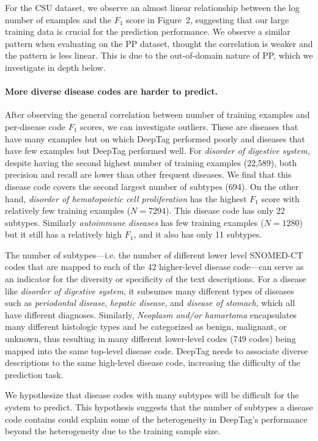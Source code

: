 \documentclass{article}[11pt,oneside]
\begin{document}
For the CSU dataset, we observe an almost linear relationship between the log number of examples and the $F_1$ score in Figure~2, suggesting that our large training data is crucial for the prediction performance. 
We observe a similar pattern when evaluating on the PP dataset, thought the correlation is weaker and the pattern is less linear. This is due to the out-of-domain nature of PP, which we investigate in depth below.

\paragraph{More diverse disease codes are harder to predict.}
After observing the general correlation between number of training examples and per-disease code $F_1$ scores, we can investigate outliers. These are diseases that have many examples but on which DeepTag performed poorly and diseases that have few examples but DeepTag performed well. For \emph{disorder of digestive system}, despite having the second highest number of training examples (22,589), both precision and recall are lower than other frequent diseases. We find that this disease code covers the second largest number of subtypes (694). On the other hand, \emph{disorder of hematopoietic cell proliferation} has the highest $F_1$ score with relatively few training examples ($N = 7294$). This disease code has only 22 subtypes. Similarly \emph{autoimmune diseases} has  few training examples ($N = 1280$) but it still has a relatively high $F_1$, and it also has only 11 subtypes.

The number of subtypes---i.e. the number of different lower level SNOMED-CT codes that are mapped to each of the 42 higher-level disease code---can serve as an indicator for the diversity or specificity of the text descriptions. For a disease like \emph{disorder of digestive system}, it subsumes many different types of diseases such as \emph{periodontal disease}, \emph{hepatic disease}, and \emph{disease of stomach}, which all have
different diagnoses. Similarly, \emph{Neoplasm and/or hamartoma} encapsulates many different histologic types and be categorized as benign, malignant, or unknown, thus resulting in many different lower-level  codes (749 codes) being mapped into the same top-level disease code. DeepTag needs to associate diverse descriptions to the same high-level disease code, increasing the difficulty of the prediction task.

We hypothesize that disease codes with many subtypes will be difficult for the system to predict. This hypothesis suggests that the number of subtypes a disease code contains could explain some of the heterogeneity in DeepTag's performance beyond the heterogeneity due to the training sample size.
\end{document}

